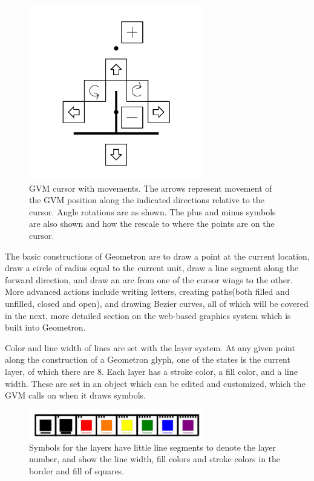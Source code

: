 \begin{figure}
	\centering
	\includegraphics[width=3in]{figures/symbol/cursormovements.png}
	\caption[cursormovements]
	{GVM cursor with movements. The arrows represent movement of the GVM position along the indicated directions relative to the cursor.  Angle rotations are as shown.  The plus and minus symbols are also shown and how the rescale to where the points are on the cursor.}
\end{figure}



The basic constructions of Geometron are to draw a point at the current location, draw a circle of radius equal to the current unit, draw a line segment along the forward direction, and draw an arc from one of the cursor wings to the other.  More advanced actions include writing letters, creating paths(both filled and unfilled, closed and open), and drawing Bezier curves, all of which will be covered in the next, more detailed section on the web-based graphics system which is built into Geometron.

Color and line width of lines are set with the layer system.  At any given point along the construction of a Geometron glyph, one of the states is the current layer, of which there are 8. Each layer has a stroke color, a fill color, and a line width.  These are set in an object which can be edited and customized, which the GVM calls on when it draws symbols.

\begin{figure}
	\centering
	\includegraphics[width=3in]{figures/symbol/colors.png}
	\caption[colors]
	{Symbols for the layers have little line segments to denote the layer number, and show the line width, fill colors and stroke colors in the border and fill of squares.}
\end{figure}

